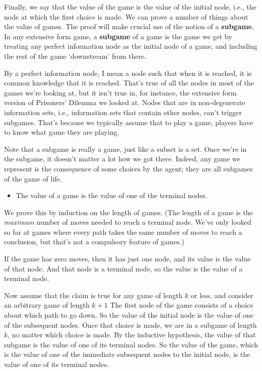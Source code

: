 \documentclass[openany]{book}
\begin{document}
\noindent Finally, we say that the value of the game is the value of the initial node, i.e., the node at which the first choice is made. We can prove a number of things about the value of games. The proof will make crucial use of the notion of a \textbf{subgame}. In any extensive form game, a \textbf{subgame} of a game is the game we get by treating any perfect information node as the initial node of a game, and including the rest of the game `downstream' from there. 

By a perfect information node, I mean a node such that when it is reached, it is common knowledge that it is reached. That's true of all the nodes in most of the games we're looking at, but it isn't true in, for instance, the extensive form version of Prisoners' Dilemma we looked at. Nodes that are in non-degenerate information sets, i.e., information sets that contain other nodes, can't trigger subgames. That's because we typically assume that to play a game, players have to know what game they are playing.

Note that a subgame is really a game, just like a subset is a set. Once we're in the subgame, it doesn't matter a lot how we got there. Indeed, any game we represent is the consequence of some choices by the agent; they are all subgames of the game of life.

\begin{itemize}
\item The value of a game is the value of one of the terminal nodes.
\end{itemize}
We prove this by induction on the length of games. (The length of a game is the \textit{maximum} number of moves needed to reach a terminal node. We've only looked so far at games where every path takes the same number of moves to reach a conclusion, but that's not a compulsory feature of games.) 

If the game has zero moves, then it has just one node, and its value is the value of that node. And that node is a terminal node, so the value is the value of a terminal node. 

Now assume that the claim is true for any game of length $k$ or less, and consider an arbitrary game of length $k + 1$ The first node of the game consists of a choice about which path to go down. So the value of the initial node is the value of one of the subsequent nodes. Once that choice is made, we are in a subgame of length $k$, no matter which choice is made. By the inductive hypothesis, the value of that subgame is the value of one of its terminal nodes. So the value of the game, which is the value of one of the immediate subsequent nodes to the initial node, is the value of one of its terminal nodes. 
\end{document}
